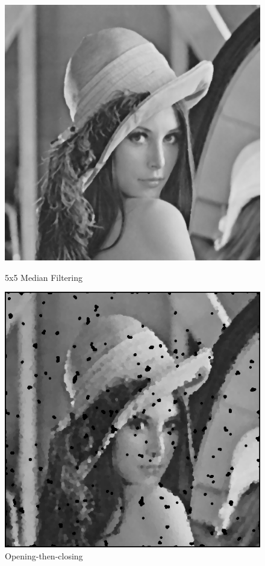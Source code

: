 \documentclass{article}
\begin{document}
\begin{figure}[H]
  \includegraphics[width=\linewidth]{img/snp5_median_5x5.png}
  \caption{5x5 Median Filtering}\label{fig:snp5_median_5x5}
\endminipage\hfill
{}
  \includegraphics[width=\linewidth]{img/snp5_open_then_close.png}
  \caption{Opening-then-closing}\label{fig:snp5_open_then_close}
\endminipage\hfill
\end{figure}
\end{document}
